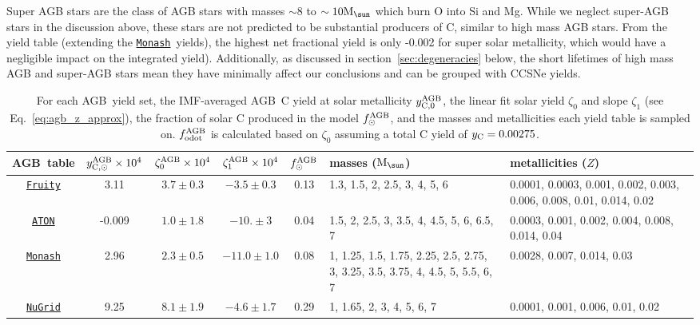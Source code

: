 \documentclass[fleqn,
usenatbib]{mnras}
\newcommand{\fruity}{\texttt{\hyperlink{fruity}{Fruity}}}
\newcommand{\nugrid}{\texttt{\hyperlink{nugrid}{NuGrid}}}
\newcommand{\monash}{\texttt{\hyperlink{monash}{Monash}}}
\newcommand{\aton}{\texttt{\hyperlink{aton}{ATON}}}
\newcommand{\agb}{AGB}
\newcommand{\Yct}{{y_{\rm C}}}
\newcommand{\zetao}{\zeta_0}
\newcommand{\zetai}{\zeta_{1}}
\newcommand{\Mo}{ {\rm M}_{\sun}}
\begin{document}
Super AGB stars are the class of AGB stars with masses $\sim8$ to $\sim10\Mo$ which burn O into Si and Mg. While we neglect super-AGB stars in the discussion above, these stars are not predicted to be substantial producers of C, similar to high mass AGB stars. From the \citet{doherty+14, doherty+14b} yield table (extending the \monash\ yields), the highest net fractional yield is only -0.002 for super solar metallicity, which would have a negligible impact on the integrated yield). Additionally, as discussed in section~\ref{sec:degeneracies} below, the short lifetimes of high mass AGB and super-AGB stars mean they have minimally affect our conclusions and can be grouped with CCSNe yields.


\begin{table}
	\centering
    \caption[]{For each \agb\ yield set, the IMF-averaged \agb\ C yield at solar metallicity $y_{\rm C, 0}^{\rm AGB}$, the linear fit solar yield $\zetao$ and slope $\zetai$ (see Eq.~\ref{eq:agb_z_approx}), the fraction of solar C produced in the model $f_\odot^{\rm AGB}$, and the masses and metallicities each yield table is sampled on.
    $f_{\rm odot}^{\rm AGB}$ is calculated based on $\zetao$ assuming a total C yield of $\Yct = 0.00275$.
    }

	\label{tab:agb}
    \begin{tabular}{c  ccc  c p{4cm} p{4cm}} %
		\hline 
        \agb\ table 
                & $y_{\rm C, \odot}^{\rm AGB}\times10^4$ %
                & $\zetao^{\rm AGB}\times 10^4$ %
                & $\zetai^{\rm AGB}\times 10^4$
                &  $f_\odot^{\rm AGB}$
                & masses ($\Mo$) & metallicities ($Z$)\\
        \hline
        \fruity 
                & 3.11
                &  $3.7\pm0.3$
                & $-3.5\pm0.3$
                & 0.13
                & 1.3, 1.5, 2, 2.5, 3, 4, 5, 6
                & 0.0001, 0.0003, 0.001, 0.002, 0.003, 0.006, 0.008, 0.01, 0.014, 0.02
                \\
        \aton 
                & -0.009
                & $1.0\pm1.8$
                & $-10. \pm 3$
                & 0.04
                & 1.5, 2, 2.5, 3, 3.5, 4, 4.5, 5, 6, 6.5, 7
                & 0.0003, 0.001, 0.002, 0.004, 0.008, 0.014, 0.04
                \\
        \monash 
                &  2.96
                & $2.3 \pm 0.5$
                & $-11.0\pm 1.0$
                & 0.08
                & 1, 1.25, 1.5, 1.75, 2.25, 2.5, 2.75, 3, 3.25, 3.5, 3.75, 4, 4.5, 5, 5.5, 6, 7 
                & 0.0028, 0.007, 0.014, 0.03
                \\
        \nugrid 
                & 9.25
                & $8.1\pm 1.9$
                & $-4.6\pm1.7$
                & 0.29
                & 1, 1.65, 2, 3, 4, 5, 6, 7
                &  0.0001, 0.001, 0.006, 0.01, 0.02
                \\
		\hline
	\end{tabular}
\end{table}
\end{document}

